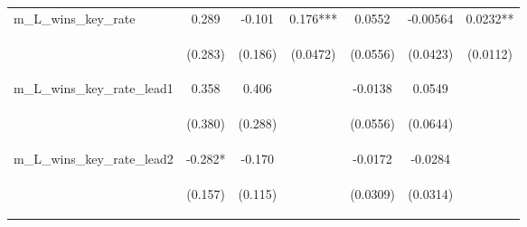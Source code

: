 \documentclass[]{article}
\begin{document}
\begin{center}
\begin{tabular}{lcccccc}
m\_L\_wins\_key\_rate & 0.289 & -0.101 & 0.176*** & 0.0552 & -0.00564 & 0.0232** \\
\vspace{4pt} & \begin{footnotesize}(0.283)\end{footnotesize} & \begin{footnotesize}(0.186)\end{footnotesize} & \begin{footnotesize}(0.0472)\end{footnotesize} & \begin{footnotesize}(0.0556)\end{footnotesize} & \begin{footnotesize}(0.0423)\end{footnotesize} & \begin{footnotesize}(0.0112)\end{footnotesize} \\
m\_L\_wins\_key\_rate\_lead1 & 0.358 & 0.406 &  & -0.0138 & 0.0549 &  \\
\vspace{4pt} & \begin{footnotesize}(0.380)\end{footnotesize} & \begin{footnotesize}(0.288)\end{footnotesize} & \begin{footnotesize}\end{footnotesize} & \begin{footnotesize}(0.0556)\end{footnotesize} & \begin{footnotesize}(0.0644)\end{footnotesize} & \begin{footnotesize}\end{footnotesize} \\
m\_L\_wins\_key\_rate\_lead2 & -0.282* & -0.170 &  & -0.0172 & -0.0284 &  \\
\vspace{4pt} & \begin{footnotesize}(0.157)\end{footnotesize} & \begin{footnotesize}(0.115)\end{footnotesize} & \begin{footnotesize}\end{footnotesize} & \begin{footnotesize}(0.0309)\end{footnotesize} & \begin{footnotesize}(0.0314)\end{footnotesize} & \begin{footnotesize}\end{footnotesize} \\

\end{tabular}
\end{center}
\end{document}
